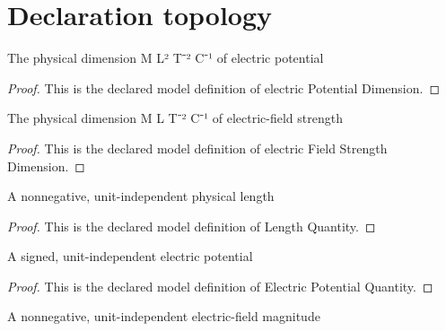 \section{Declaration topology}
\begin{definition}
  \label{def:physics:phyx-mini-0876:phyxminiproblems-problemphyxmini0876-electricpotentialdimension}
  The physical dimension M L² T⁻² C⁻¹ of electric potential
\end{definition}
\begin{proof}
  This is the declared model definition of electric Potential Dimension.
\end{proof}
\begin{definition}
  \label{def:physics:phyx-mini-0876:phyxminiproblems-problemphyxmini0876-electricfieldstrengthdimension}
  The physical dimension M L T⁻² C⁻¹ of electric-field strength
\end{definition}
\begin{proof}
  This is the declared model definition of electric Field Strength Dimension.
\end{proof}
\begin{definition}
  \label{def:physics:phyx-mini-0876:phyxminiproblems-problemphyxmini0876-lengthquantity}
  A nonnegative, unit-independent physical length
\end{definition}
\begin{proof}
  This is the declared model definition of Length Quantity.
\end{proof}
\begin{definition}
  \label{def:physics:phyx-mini-0876:phyxminiproblems-problemphyxmini0876-electricpotentialquantity}
  A signed, unit-independent electric potential
\end{definition}
\begin{proof}
  This is the declared model definition of Electric Potential Quantity.
\end{proof}
\begin{definition}
  \label{def:physics:phyx-mini-0876:phyxminiproblems-problemphyxmini0876-electricfieldmagnitudequantity}
  A nonnegative, unit-independent electric-field magnitude
\end{definition}
